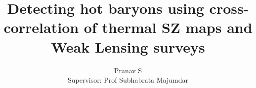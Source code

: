 


\title{Detecting hot baryons using cross-correlation of thermal SZ maps and Weak Lensing surveys}
\author{Pranav S \\ Supervisor: Prof Subhabrata Majumdar}
\maketitle


\tableofcontents










